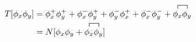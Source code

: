 \documentclass[margin=3pt]{standalone}
\begin{document}
\fontsize{14}{16}
$\displaystyle
\begin{align*}
    T[\phi_x \phi_y]
    &= \phi_x^+ \phi_y^+ + \phi_x^- \phi_y^+
    + \phi_y^- \phi_x^+ + \phi_x^- \phi_y^-
    + \contraction[1ex]{}{\phi_x}{}{\phi_y}
    \phi_x \phi_y
    \\
    &= N[
        \phi_x \phi_y + 
        \contraction[1ex]{}{\phi_x}{}{\phi_y}
        \phi_x \phi_y
    ]
\end{align*}
$
    
\end{document}
